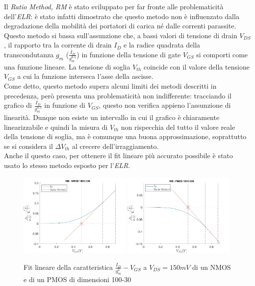 \documentclass[12pt, letterpaper]{book}
\begin{document}
Il \emph{Ratio Method, RM} è stato sviluppato per far fronte alle problematicità dell'\emph{ELR}: è stato infatti dimostrato che questo metodo non è influenzato dalla degradazione della mobilità dei portatori di carica né dalle correnti parassite. Questo metodo si bassa sull'assunzione che, a bassi valori di tensione di drain $V_{DS}$, il rapporto tra la corrente di drain $I_D$ e la radice quadrata della transcondutanza $g_m$ ($\frac{I_D}{g_m^{0.5}}$) in funzione della tensione di gate $V_{GS}$ si comporti come una funzione lineare. La tensione di soglia $V_{th}$ coincide con il valore della tensione $V_{GS}$ a cui la funzione interseca l'asse della ascisse. \\
Come detto, questo metodo supera alcuni limiti dei metodi descritti in precedenza, però presenta una problematicità non indifferente: tracciando il grafico di $\frac{I_D}{g_m^{0.5}}$ in funzione di $V_{GS}$, questo non verifica appieno l'assunzione di linearità. Dunque non esiste un intervallo in cui il grafico è chiaramente linearizzabile e quindi la misura di $V_{th}$ non rispecchia del tutto il valore reale della tensione di soglia, ma è comunque una buona approssimazione, soprattutto se si considera il $\Delta V_{th}$ al crecere dell'irraggiamento.\\
Anche il questo caso, per ottenere il fit lineare più accurato possibile è stato usato lo stesso metodo esposto per l'\emph{ELR}.

\begin{figure}[h!]
  \centering
  \includegraphics[width=0.49\textwidth]{RM-N4-100-30}
  \includegraphics[width=0.49\textwidth]{RM-P1-100-30}
  \caption{Fit lineare della caratteristica $\frac{I_D}{g_m^2}-V_{GS}$ a $V_{DS}=150mV$ di un NMOS e di un PMOS di dimensioni 100-30}
\end{figure}
\end{document}
